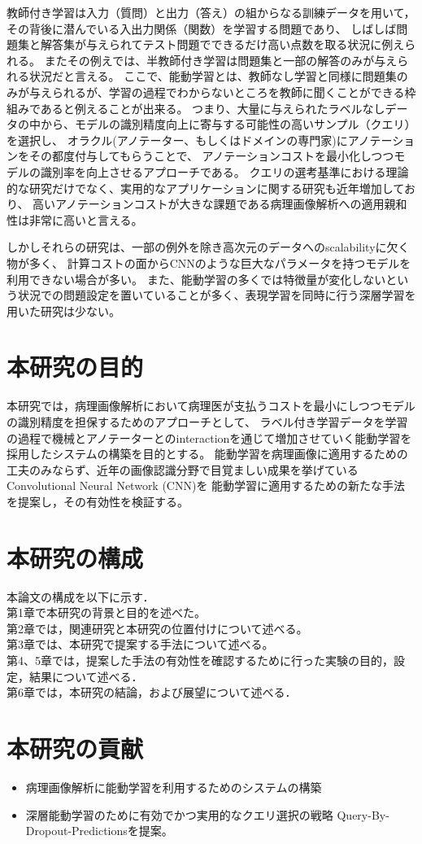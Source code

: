 教師付き学習は入力（質問）と出力（答え）の組からなる訓練データを用いて， その背後に潜んでいる入出力関係（関数）を学習する問題であり、
しばしば問題集と解答集が与えられてテスト問題でできるだけ高い点数を取る状況に例えられる。
またその例えでは、半教師付き学習は問題集と一部の解答のみが与えられる状況だと言える。
ここで、能動学習とは、教師なし学習と同様に問題集のみが与えられるが、学習の過程でわからないところを教師に聞くことができる枠組みであると例えることが出来る。
つまり、大量に与えられたラベルなしデータの中から、モデルの識別精度向上に寄与する可能性の高いサンプル（クエリ）を選択し、
オラクル(アノテーター、もしくはドメインの専門家)にアノテーションをその都度付与してもらうことで、
アノテーションコストを最小化しつつモデルの識別率を向上させるアプローチである。
クエリの選考基準における理論的な研究だけでなく、実用的なアプリケーションに関する研究も近年増加しており、
高いアノテーションコストが大きな課題である病理画像解析への適用親和性は非常に高いと言える。

しかしそれらの研究は、一部の例外を除き高次元のデータへのscalabilityに欠く物が多く、
計算コストの面からCNNのような巨大なパラメータを持つモデルを利用できない場合が多い。
また、能動学習の多くでは特徴量が変化しないという状況での問題設定を置いていることが多く、表現学習を同時に行う深層学習を用いた研究は少ない。

\section{本研究の目的}
本研究では，病理画像解析において病理医が支払うコストを最小にしつつモデルの識別精度を担保するためのアプローチとして、
ラベル付き学習データを学習の過程で機械とアノテーターとのinteractionを通じて増加させていく能動学習を採用したシステムの構築を目的とする。
能動学習を病理画像に適用するための工夫のみならず、近年の画像認識分野で目覚ましい成果を挙げているConvolutional Neural Network (CNN)を
能動学習に適用するための新たな手法を提案し，その有効性を検証する。


\section{本研究の構成}
本論文の構成を以下に示す．\\
第1章で本研究の背景と目的を述べた。 \\
第2章では，関連研究と本研究の位置付けについて述べる。\\
第3章では、本研究で提案する手法について述べる。\\
第4、5章では，提案した手法の有効性を確認するために行った実験の目的，設定，結果について述べる．\\
第6章では，本研究の結論，および展望について述べる．

\section{本研究の貢献}
\begin{itemize}
    \item 病理画像解析に能動学習を利用するためのシステムの構築
    \item 深層能動学習のために有効でかつ実用的なクエリ選択の戦略 Query-By-Dropout-Predictionsを提案。
\end{itemize}
